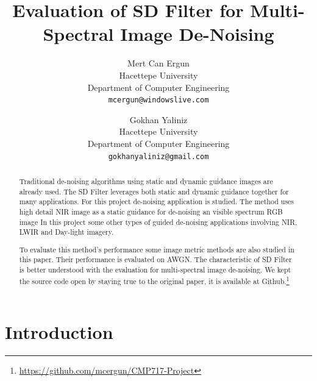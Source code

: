 \documentclass[10pt,twocolumn,letterpaper]{article}
\begin{document}
	
	\title{Evaluation of SD Filter for Multi-Spectral Image De-Noising}
	
	\author{Mert Can Ergun\\
		Hacettepe University\\
		Department of Computer Engineering\\
		{\tt\small mcergun@windowslive.com}
		\and
		Gokhan Yaliniz\\
		Hacettepe University\\
		Department of Computer Engineering\\
		{\tt\small gokhanyaliniz@gmail.com}
	}
	
	\maketitle
	
	\begin{abstract}
		Traditional de-noising algorithms using static and dynamic guidance images are already used. The SD Filter leverages both static and dynamic guidance together for many applications. For this project de-noising application is studied. The method uses high detail NIR image as a static guidance for de-noising an visible spectrum RGB image\cite{ham2015robust} In this project some other types of guided de-noising applications involving NIR, LWIR and Day-light imagery.
		
		To evaluate this method's performance some image metric methods are also studied in this paper. Their performance is evaluated on AWGN.
		The characteristic of SD Filter\cite{ham2015robust} is better understood with the evaluation for multi-spectral image de-noising.
		We kept the source code open by staying true to the original paper\cite{ham2015robust}, it is available at Github.\footnote{\href{https://github.com/mcergun/CMP717-Project}{https://github.com/mcergun/CMP717-Project}}
	\end{abstract}
	
	\section{Introduction}
	
\end{document}
